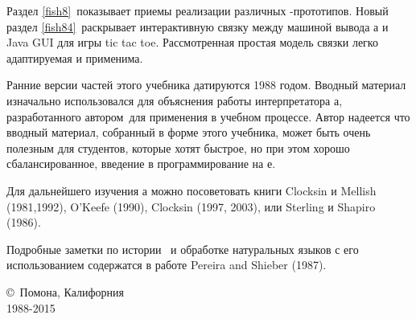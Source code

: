 Раздел \ref{fish8}\ показывает приемы реализации различных \prolog-прототипов.
Новый раздел \ref{fish84}\ раскрывает интерактивную связку между машиной вывода
\prolog а и Java GUI для игры tic tac toe. Рассмотренная простая модель связки
легко адаптируемая и применима.

Ранние версии частей этого учебника датируются 1988 годом. Вводный материал
изначально использовался для объяснения работы интерпретатора \prolog а,
разработанного автором\ для применения в учебном
процессе. Автор надеется что вводный материал, собранный в форме этого учебника,
может быть очень полезным для студентов, которые хотят быстрое, но при этом
хорошо сбалансированное, введение в программирование на \prolog е.

Для дальнейшего изучения \prolog а можно посоветовать книги
Clocksin и Mellish (1981,1992), O'Keefe (1990), Clocksin (1997, 2003),
или Sterling и Shapiro (1986).

Подробные заметки по истории \prolog\ и обработке натуральных языков с его
использованием содержатся в работе Pereira and Shieber (1987).

\copyright\ Помона, Калифорния\\ 1988-2015
